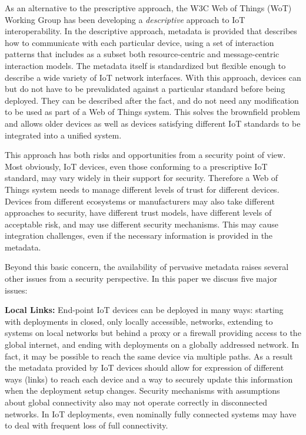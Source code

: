 As an alternative to the prescriptive approach,
the W3C Web of Things (WoT) Working Group has been developing a \emph{descriptive} 
approach to IoT interoperability.
In the descriptive approach,
metadata is provided that describes how to communicate with each particular device,
using a set of interaction patterns that includes as a subset both resource-centric
and message-centric interaction models.
The metadata itself is standardized but flexible enough to describe a wide variety of
IoT network interfaces.
With this approach,
devices can but do not have to be prevalidated against 
a particular standard before being deployed.
They can be described after the fact,
and do not need any modification to be
used as part of a Web of Things system.
This solves the brownfield problem and allows
older devices as well as devices satisfying different IoT 
standards to be integrated into a unified system.  

This approach has both risks and opportunities from a security point of view.
Most obviously, IoT devices, even those conforming to a prescriptive IoT standard,
may vary widely in their support for security.
Therefore a Web of Things system
needs to manage different levels of trust for different devices.
Devices from different ecosystems or manufacturers may also take different approaches to
security, have different trust models, have different levels of acceptable risk,
and may use different security mechanisms. 
This may cause integration challenges, even if the necessary
information is provided in the metadata.

Beyond this basic concern,
the availability of pervasive metadata raises several other issues
from a security perspective.
In this paper we discuss five major issues:


\noindent\textbf{Local Links:}
End-point IoT devices can be deployed in many ways: 
starting with deployments in closed, only locally accessible,
networks, extending to systems on local networks but behind a proxy or a firewall 
providing access to the global internet, and ending with deployments on a globally addressed network. 
In fact, it may be possible to reach the same device via multiple paths.
As a result the metadata provided by IoT devices should allow for expression of
different ways (links) to reach each device 
and a way to securely update this information when the deployment setup changes. 
Security mechanisms with assumptions about global connectivity also may not
operate correctly in disconnected networks.
In IoT deployments, even nominally fully connected systems may have to 
deal with frequent loss of full connectivity.



